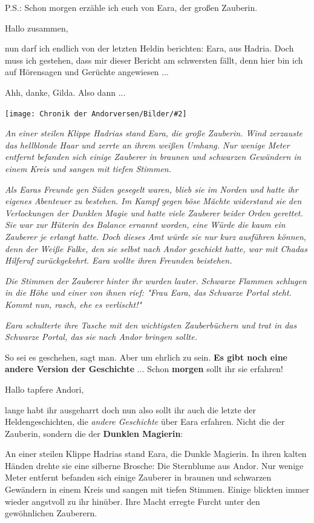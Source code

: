 \documentclass[10pt, a4paper, oneside]{book}
\newcommand{\bildmitts}[2][height=0.32\textwidth,width=0.48\textwidth,keepaspectratio]{%
    \begin{center}
        \texttt{[image: Chronik der Andorversen/Bilder/\#2]}
    \end{center}
}
\begin{document}
\begin{multicols}{2}
P.S.: Schon morgen erzähle ich euch von Eara, der großen Zauberin.\bigskip

Hallo zusammen,

nun darf ich endlich von der letzten Heldin berichten: Eara, aus Hadria. Doch muss ich gestehen, dass mir dieser Bericht am schwersten fällt, denn hier bin ich auf Hörensagen und Gerüchte angewiesen ...

Ahh, danke, Gilda. Also dann ...

\bildmitts{Andor III Eara.jpeg}

\textit{An einer steilen Klippe Hadrias stand Eara, die große Zauberin. Wind zerzauste das hellblonde Haar und zerrte an ihrem weißen Umhang. Nur wenige Meter entfernt befanden sich einige Zauberer in braunen und schwarzen Gewändern in einem Kreis und sangen mit tiefen Stimmen.}

\textit{Als Earas Freunde gen Süden gesegelt waren, blieb sie im Norden und hatte ihr eigenes Abenteuer zu bestehen. Im Kampf gegen böse Mächte widerstand sie den Verlockungen der Dunklen Magie und hatte viele Zauberer beider Orden gerettet. Sie war zur Hüterin des Balance ernannt worden, eine Würde die kaum ein Zauberer je erlangt hatte. Doch dieses Amt würde sie nur kurz ausführen können, denn der Weiße Falke, den sie selbst nach Andor geschickt hatte, war mit Chadas Hilferuf zurückgekehrt. Eara wollte ihren Freunden beistehen.}

\textit{Die Stimmen der Zauberer hinter ihr wurden lauter. Schwarze Flammen schlugen in die Höhe und einer von ihnen rief: "Frau Eara, das Schwarze Portal steht. Kommt nun, rasch, ehe es verlischt!"}

\textit{Eara schulterte ihre Tasche mit den wichtigsten Zauberbüchern und trat in das Schwarze Portal, das sie nach Andor bringen sollte.}


So sei es geschehen, sagt man. Aber um ehrlich zu sein. \textbf{Es gibt noch eine andere Version der Geschichte} ... Schon \textbf{morgen} sollt ihr sie erfahren!\bigskip

Hallo tapfere Andori,

lange habt ihr ausgeharrt doch nun also sollt ihr auch die letzte der Heldengeschichten, die \textit{andere Geschichte} über Eara erfahren. Nicht die der Zauberin, sondern die der \textbf{Dunklen Magierin}:



An einer steilen Klippe Hadrias stand Eara, die Dunkle Magierin. In ihren kalten Händen drehte sie eine silberne Brosche: Die Sternblume aus Andor. Nur wenige Meter entfernt befanden sich einige Zauberer in braunen und schwarzen Gewändern in einem Kreis und sangen mit tiefen Stimmen. Einige blickten immer wieder angstvoll zu ihr hinüber. Ihre Macht erregte Furcht unter den gewöhnlichen Zauberern.


\end{multicols}
\end{document}
